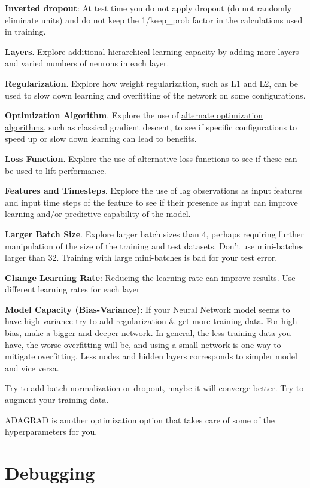 \documentclass[]{book}
\begin{document}
\textbf{Inverted dropout}: At test time you do not apply dropout (do not
randomly eliminate units) and do not keep the 1/keep\_prob factor in the
calculations used in training.

\textbf{Layers}. Explore additional hierarchical learning capacity by
adding more layers and varied numbers of neurons in each layer.

\textbf{Regularization}. Explore how weight regularization, such as L1
and L2, can be used to slow down learning and overfitting of the network
on some configurations.

\textbf{Optimization Algorithm}. Explore the use of
\href{https://keras.io/optimizers/}{alternate optimization algorithms},
such as classical gradient descent, to see if specific configurations to
speed up or slow down learning can lead to benefits.

\textbf{Loss Function}. Explore the use of
\href{https://keras.io/objectives/}{alternative loss functions} to see
if these can be used to lift performance.

\textbf{Features and Timesteps}. Explore the use of lag observations as
input features and input time steps of the feature to see if their
presence as input can improve learning and/or predictive capability of
the model.

\textbf{Larger Batch Size}. Explore larger batch sizes than 4, perhaps
requiring further manipulation of the size of the training and test
datasets. Don't use mini-batches larger than 32. Training with large
mini-batches is bad for your test error.

\textbf{Change Learning Rate}: Reducing the learning rate can improve
results. Use different learning rates for each layer

\textbf{Model Capacity (Bias-Variance)}: If your Neural Network model
seems to have high variance try to add regularization \& get more
training data. For high bias, make a bigger and deeper network. In
general, the less training data you have, the worse overfitting will be,
and using a small network is one way to mitigate overfitting. Less nodes
and hidden layers corresponds to simpler model and vice versa.

Try to add batch normalization or dropout, maybe it will converge
better. Try to augment your training data.

ADAGRAD is another optimization option that takes care of some of the
hyperparameters for you.

\section{Debugging}\label{debugging}
\end{document}
